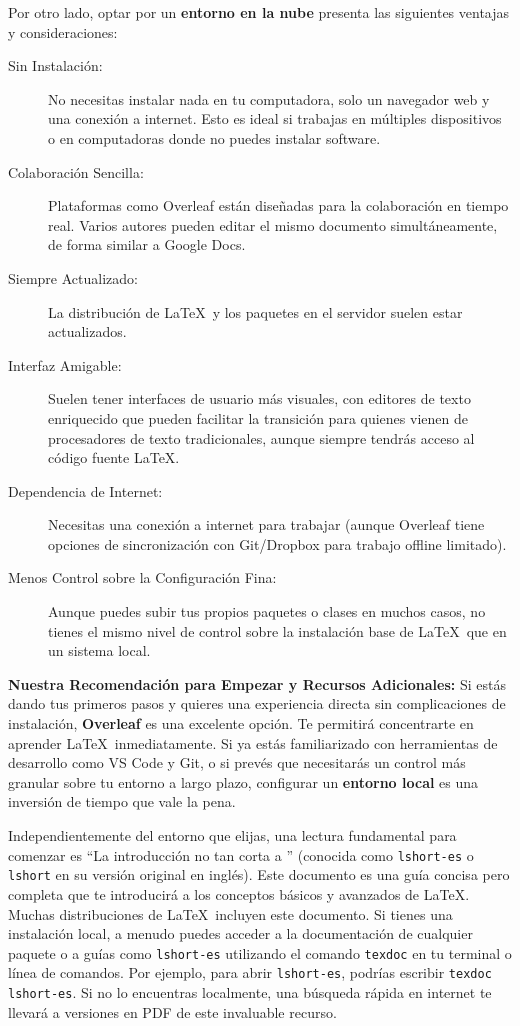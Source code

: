 Por otro lado, optar por un \textbf{entorno en la nube} presenta las siguientes ventajas y consideraciones:
\begin{description}
  \item[Sin Instalación:] No necesitas instalar nada en tu computadora, solo un navegador web y una conexión a internet.
        Esto es ideal si trabajas en múltiples dispositivos o en computadoras donde no puedes instalar software.
  \item[Colaboración Sencilla:] Plataformas como Overleaf están diseñadas para la colaboración en tiempo real.
        Varios autores pueden editar el mismo documento simultáneamente, de forma similar a Google Docs.
  \item[Siempre Actualizado:] La distribución de \LaTeX\ y los paquetes en el servidor suelen estar actualizados.
  \item[Interfaz Amigable:] Suelen tener interfaces de usuario más visuales, con editores de texto enriquecido que pueden facilitar la transición para quienes vienen de procesadores de texto tradicionales, aunque siempre tendrás acceso al código fuente \LaTeX.
  \item[Dependencia de Internet:] Necesitas una conexión a internet para trabajar (aunque Overleaf tiene opciones de sincronización con Git/Dropbox para trabajo offline limitado).
  \item[Menos Control sobre la Configuración Fina:] Aunque puedes subir tus propios paquetes o clases en muchos casos, no tienes el mismo nivel de control sobre la instalación base de \LaTeX\ que en un sistema local.
\end{description}

\textbf{Nuestra Recomendación para Empezar y Recursos Adicionales:}
Si estás dando tus primeros pasos y quieres una experiencia directa sin complicaciones de instalación, \textbf{Overleaf} es una excelente opción.
Te permitirá concentrarte en aprender \LaTeX\ inmediatamente.
Si ya estás familiarizado con herramientas de desarrollo como VS Code y Git, o si prevés que necesitarás un control más granular sobre tu entorno a largo plazo, configurar un \textbf{entorno local} es una inversión de tiempo que vale la pena.

Independientemente del entorno que elijas, una lectura fundamental para comenzar es ``La introducción no tan corta a \LaTeXe'' (conocida como \texttt{lshort-es} o \texttt{lshort} en su versión original en inglés).
Este documento es una guía concisa pero completa que te introducirá a los conceptos básicos y avanzados de \LaTeX.
Muchas distribuciones de \LaTeX\ incluyen este documento.
Si tienes una instalación local, a menudo puedes acceder a la documentación de cualquier paquete o a guías como \texttt{lshort-es} utilizando el comando \texttt{texdoc} en tu terminal o línea de comandos.
Por ejemplo, para abrir \texttt{lshort-es}, podrías escribir \texttt{texdoc lshort-es}.
Si no lo encuentras localmente, una búsqueda rápida en internet te llevará a versiones en PDF de este invaluable recurso.


